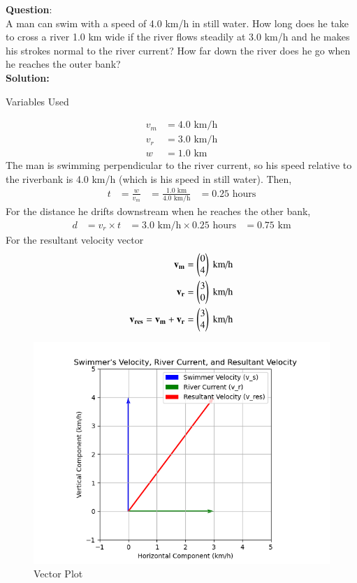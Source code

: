 \documentclass[journal]{IEEEtran}
\begin{document}
\textbf{Question}:\\
A man can swim with a speed of 4.0 km/h in still water. How long does he take to cross a river 1.0 km wide if the river flows steadily at 3.0 km/h and he makes his strokes normal to the river current? How far down the river does he go when he reaches the outer bank? \\
\textbf{Solution: }
\begin{table}[h!]    
  \centering
  
  \caption{Variables Used}
  \label{tab 1.2.26.1}
\end{table}
\begin{align}
	v_{m} &= 4.0 \text{ km/h} \\
	v_{r} &= 3.0 \text{ km/h} \\
	w &= 1.0 \text{ km}
\end{align}
The man is swimming perpendicular to the river current, so his speed relative to the riverbank is 4.0 km/h (which is his speed in still water). Then,
\begin{align}
	t &= \frac{w}{v_{m}} &= \frac{1.0 \text{ km}}{4.0 \text{ km/h}} &= 0.25 \text{ hours}
\end{align}
For the distance he drifts downstream when he reaches the other bank,
\begin{align}
	d &= v_{r} \times t &= 3.0 \text{ km/h} \times 0.25 \text{ hours} &= 0.75 \text{ km}
\end{align}
For the resultant velocity vector
\begin{align}
	\mathbf{v_{m}}=\begin{pmatrix}0 \\ 4\end{pmatrix} \text{ km/h} \\
	\mathbf{v_{r}}=\begin{pmatrix}3 \\ 0\end{pmatrix} \text{ km/h} \\
	\mathbf{v_{res}}=\mathbf{v_{m}}+\mathbf{v_{r}}=\begin{pmatrix} 3 \\ 4\end{pmatrix} \text{ km/h}
\end{align}
\begin{figure}[h!]
   \centering
   \includegraphics[width=0.7\linewidth]{figures/Figure_1.png}
   \caption{Vector Plot}
   \label{vector}
\end{figure}
\end{document}
